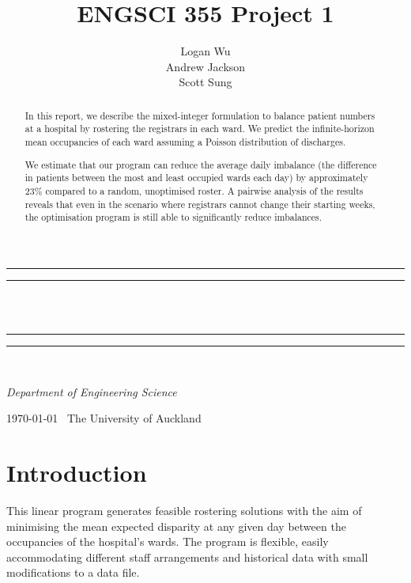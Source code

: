 \documentclass[a4paper]{article}
\title{ENGSCI 355 Project 1}
\author{Logan Wu\\Andrew Jackson\\Scott Sung}
\newlength{\drop}
\begin{document}
\begin{titlepage}
    \textheight
    \centering
    \vspace*{\baselineskip}
    \rule{\textwidth}{1.6pt}\vspace*{-\baselineskip}\vspace*{2pt}
    \rule{\textwidth}{0.4pt}\\[\baselineskip]
    {\LARGE \@title}\\[0.2\baselineskip]
    \rule{\textwidth}{0.4pt}\vspace*{-\baselineskip}\vspace{3.2pt}
    \rule{\textwidth}{1.6pt}\\[\baselineskip]
    \vspace*{2\baselineskip}
    {\Large \textsc{\@author}\par}
    {\itshape Department of Engineering Science\par}
    \vspace*{2\baselineskip}
    {\scshape \today} \        {\large The University of Auckland}\par
    \vspace{\fill}
    \begin{abstract}
    In this report, we describe the mixed-integer formulation to balance patient numbers at a hospital by rostering the registrars in each ward. We predict the infinite-horizon mean occupancies of each ward assuming a Poisson distribution of discharges.
    
We estimate that our program can reduce the average daily imbalance (the difference in patients between the most and least occupied wards each day) by approximately 23\% compared to a random, unoptimised roster. A pairwise analysis of the results reveals that even in the scenario where registrars cannot change their starting weeks, the optimisation program is still able to significantly reduce imbalances.
    \end{abstract}
    \vspace{\fill}
\end{titlepage}
\makeatother
\pagestyle{fancy}

\section{Introduction}

This linear program generates feasible rostering solutions with the aim of minimising the mean expected disparity at any given day between the occupancies of the hospital's wards. The program is flexible, easily accommodating different staff arrangements and historical data with small modifications to a data file.
\end{document}
